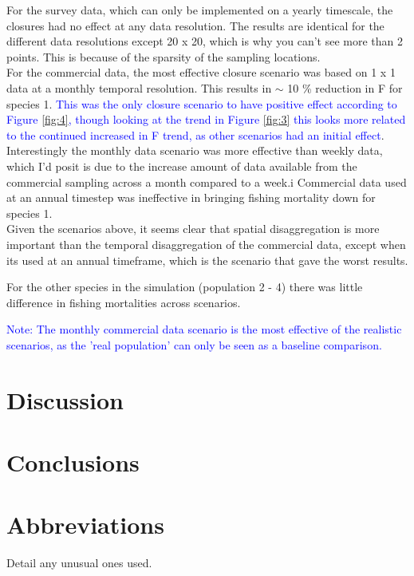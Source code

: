 \documentclass[review]{elsarticle}
\begin{document}
For the survey data, which can only be implemented on a yearly timescale, the
closures had no effect at any data resolution. The results are identical for
the different data resolutions except 20 x 20, which is why you can't see more
than 2 points. This is because of the sparsity of the sampling locations.\\

For the commercial data, the most effective closure scenario was based on 1 x 1
data at a monthly temporal resolution. This results in $\sim$ 10 \% reduction
in F for species 1. \textcolor{blue}{This was the only closure scenario to have
	positive effect according to Figure \ref{fig:4}, though looking at the
	trend in Figure \ref{fig:3} this looks more related to the continued
	increased in F trend, as other scenarios had an initial effect}.
Interestingly the monthly data scenario was more effective than weekly data,
which I'd posit is due to the increase amount of data available from the
commercial sampling across a month compared to a week.i Commercial data used at
an annual timestep was ineffective in bringing fishing mortality down for
species 1. \\

Given the scenarios above, it seems clear that spatial disaggregation is more
important than the temporal disaggregation of the commercial data, except when
its used at an annual timeframe, which is the scenario that gave the worst
results.

For the other species in the simulation (population 2 - 4) there was little
difference in fishing mortalities across scenarios.

\textcolor{blue}{Note: The monthly commercial data scenario is the most
	effective of the realistic scenarios, as the 'real population' can only
	be seen as a baseline comparison.}

\section{Discussion}

\section{Conclusions}

\section*{Abbreviations} Detail any unusual ones used.
\end{document}
